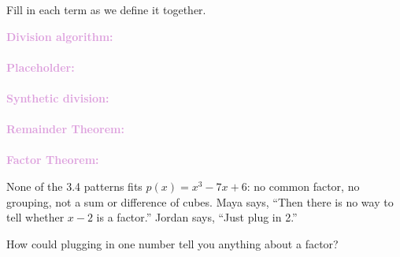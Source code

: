 \documentclass[10pt]{article}
\begin{document}

\vspace{0.12in}

\boxguard
\begin{vocabbox}
Fill in each term as we define it together.
\par\vspace{2pt}
\noindent\textbf{\textcolor{plum}{Division algorithm:}}\\[1pt]
\writeline\\[3pt]
\noindent\textbf{\textcolor{plum}{Placeholder:}}\\[1pt]
\writeline\\[3pt]
\noindent\textbf{\textcolor{plum}{Synthetic division:}}\\[1pt]
\writeline\\[3pt]
\noindent\textbf{\textcolor{plum}{Remainder Theorem:}}\\[1pt]
\writeline\\[3pt]
\noindent\textbf{\textcolor{plum}{Factor Theorem:}}\\[1pt]
\writeline
\end{vocabbox}

\vspace{0.1in}

\boxguard
\begin{hookbox}
None of the 3.4 patterns fits $p(x) = x^3 - 7x + 6$: no common factor, no grouping, not a sum
or difference of cubes. Maya says, ``Then there is no way to tell whether $x - 2$ is a factor.''
Jordan says, ``Just plug in 2.''

How could plugging in one number tell you anything about a factor?
\end{hookbox}
\end{document}
